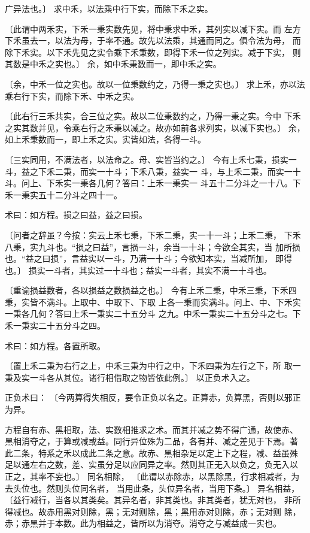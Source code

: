\documentclass[a4paper,12pt,UTF8,twoside]{ctexbook}
\begin{document}
广异法也。〕 求中禾，以法乘中行下实，而除下禾之实。

〔此谓中两禾实，下禾一秉实数先见，将中秉求中禾，其列实以减下实。而 左方下禾虽去一，以法为母，于率不通。故先以法乘，其通而同之。俱令法为母， 而除下禾实。以下禾先见之实令乘下禾秉数，即得下禾一位之列实。减于下实， 则其数是中禾之实也。〕 余，如中禾秉数而一，即中禾之实。

〔余，中禾一位之实也。故以一位秉数约之，乃得一秉之实也。〕 求上禾，亦以法乘右行下实，而除下禾、中禾之实。

〔此右行三禾共实，合三位之实。故以二位秉数约之，乃得一秉之实。今中 下禾之实其数并见，令乘右行之禾秉以减之。故亦如前各求列实，以减下实也。〕 余，如上禾秉数而一，即上禾之实。实皆如法，各得一斗。

〔三实同用，不满法者，以法命之。母、实皆当约之。〕 今有上禾七秉，损实一斗，益之下禾二秉，而实一十斗；下禾八秉，益实一 斗，与上禾二秉，而实一十斗。问上、下禾实一秉各几何？答曰：上禾一秉实一 斗五十二分斗之一十八。下禾一秉实五十二分斗之四十一。

术曰：如方程。损之曰益，益之曰损。

〔问者之辞虽？今按：实云上禾七秉，下禾二秉，实一十一斗；上禾二秉， 下禾八秉，实九斗也。“损之曰益”，言损一斗，余当一十斗；今欲全其实，当 加所损也。“益之曰损”，言益实以一斗，乃满一十斗；今欲知本实，当减所加， 即得也。〕 损实一斗者，其实过一十斗也；益实一斗者，其实不满一十斗也。

〔重谕损益数者，各以损益之数损益之也。〕 今有上禾二秉，中禾三秉，下禾四秉，实皆不满斗。上取中、中取下、下取 上各一秉而实满斗。问上、中、下禾实一秉各几何？答曰上禾一秉实二十五分斗 之九。中禾一秉实二十五分斗之七。下禾一秉实二十五分斗之四。

术曰：如方程。各置所取。

〔置上禾二秉为右行之上，中禾三秉为中行之中，下禾四秉为左行之下，所 取一秉及实一斗各从其位。诸行相借取之物皆依此例。〕 以正负术入之。

正负术曰： 〔今两算得失相反，要令正负以名之。正算赤，负算黑，否则以邪正为异。

方程自有赤、黑相取，法、实数相推求之术。而其并减之势不得广通，故使赤、 黑相消夺之，于算或减或益。同行异位殊为二品，各有并、减之差见于下焉。著 此二条，特系之禾以成此二条之意。故赤、黑相杂足以定上下之程，减、益虽殊 足以通左右之数，差、实虽分足以应同异之率。然则其正无入以负之，负无入以 正之，其率不妄也。〕 同名相除， 〔此谓以赤除赤，以黑除黑，行求相减者，为去头位也。然则头位同名者， 当用此条，头位异名者，当用下条。〕 异名相益， 〔益行减行，当各以其类矣。其异名者，非其类也。非其类者，犹无对也， 非所得减也。故赤用黑对则除，黑；无对则除，黑；黑用赤对则除，赤；无对则 除，赤；赤黑并于本数。此为相益之，皆所以为消夺。消夺之与减益成一实也。
\end{document}
